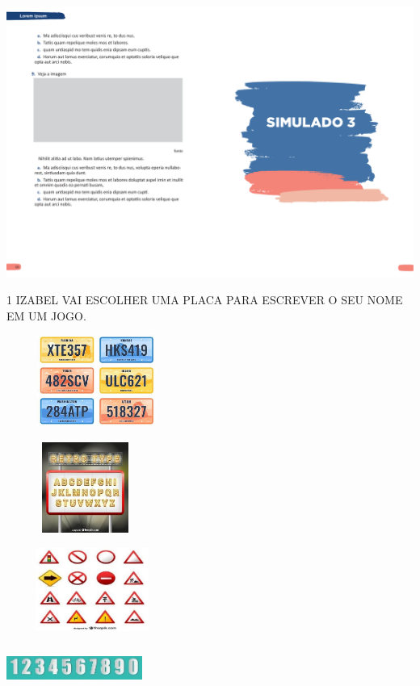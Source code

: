 \blankpage

\vspace*{-4.2cm}
\hspace*{-4cm}\includegraphics[scale=1]{../watermarks/3simulado5ano.pdf}


\pagebreak

\num{1} IZABEL VAI ESCOLHER UMA PLACA PARA ESCREVER O SEU NOME EM UM JOGO.

\begin{escolha}
\item \includegraphics[width=2.32569in,height=1.18472in]{media/image222.jpg}

\item \includegraphics[width=2.03125in,height=1.17361in]{media/image223.jpg}

\item \includegraphics[width=2.20764in,height=1.07569in]{media/image224.jpg}

\item \includegraphics[width=1.75000in,height=0.54792in]{media/image225.jpg}
\end{escolha}

